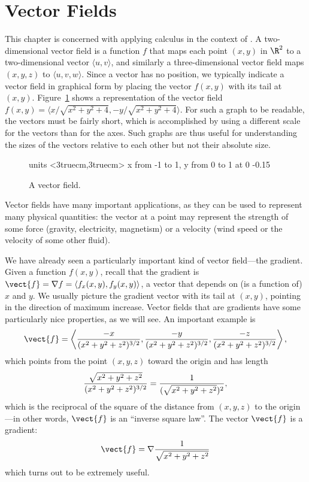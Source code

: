 \section{Vector Fields}\label{sec:VectorFields}

This chapter is concerned with applying calculus in the context of 
. A two-dimensional vector
field is a function $f$ that maps each point $(x,y)$ in $\R^2$ to a
two-dimensional vector $\langle u,v\rangle$, and similarly a
three-dimensional vector field maps $(x,y,z)$ to $\langle
u,v,w\rangle$. Since a vector has no position, we typically indicate a
vector field in graphical form by placing the vector $f(x,y)$ with its
tail at $(x,y)$. Figure~\ref{fig:vector field} shows a
representation of the vector field 
$f(x,y)=\langle x/\sqrt{x^2+y^2+4},-y/\sqrt{x^2+y^2+4}\rangle$.
For such a graph to be readable, the vectors must be fairly short,
which is accomplished by using a different scale for the vectors than
for the axes. Such graphs are thus useful for understanding the sizes
of the vectors relative to each other but not their absolute size.


\begin{figure}[H]
\centerline{
\vbox{\beginpicture
\normalgraphs
\setcoordinatesystem units <3truecm,3truecm>
\setplotarea x from -1 to 1, y from 0 to 1
 at 0 -0.15
\endpicture}}
\caption{A vector field. \label{fig:vector field}}
\end{figure}

Vector fields have many important applications, as they can be used to
represent many physical quantities: the vector at a point may
represent the strength of some force (gravity, electricity, magnetism) or
a velocity (wind speed or the velocity of some other fluid). 

We have already seen a particularly important kind of vector
field---the gradient. Given a function $f(x,y)$, recall that the
gradient is $\vect{f} = \nabla f  = \langle f_x(x,y),f_y(x,y)\rangle$, a vector that depends
on (is a function of) $x$ and $y$. We usually picture the gradient
vector with its tail at $(x,y)$, pointing in the direction of maximum
increase. Vector fields that are gradients have some particularly nice
properties, as we will see.
An important example is 
$$\vect{f}=
\left
\langle {-x\over (x^2+y^2+z^2)^{3/2}},{-y\over (x^2+y^2+z^2)^{3/2}},{-z\over
  (x^2+y^2+z^2)^{3/2}}\right\rangle,$$
which points from the point $(x,y,z)$ toward the origin and has length
$${\sqrt{x^2+y^2+z^2}\over(x^2+y^2+z^2)^{3/2}}=
{1\over(\sqrt{x^2+y^2+z^2})^2},$$
which is the reciprocal of the square of the distance from $(x,y,z)$
to the origin---in other words, $\vect{f}$ is an ``inverse square
law''.
The vector $\vect{f}$ is a gradient:
\begin{equation}\label{eq:inverse square field as gradient}
\vect{f} = \nabla {1\over\sqrt{x^2+y^2+z^2} }
\end{equation}
which turns out to be extremely useful.



